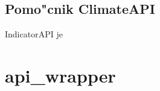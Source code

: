 % 
% 
% 
% 
% 
% 


\subsection{Pomo"cnik ClimateAPI}

IndicatorAPI je 


% 
% 



\section{api\_wrapper}





